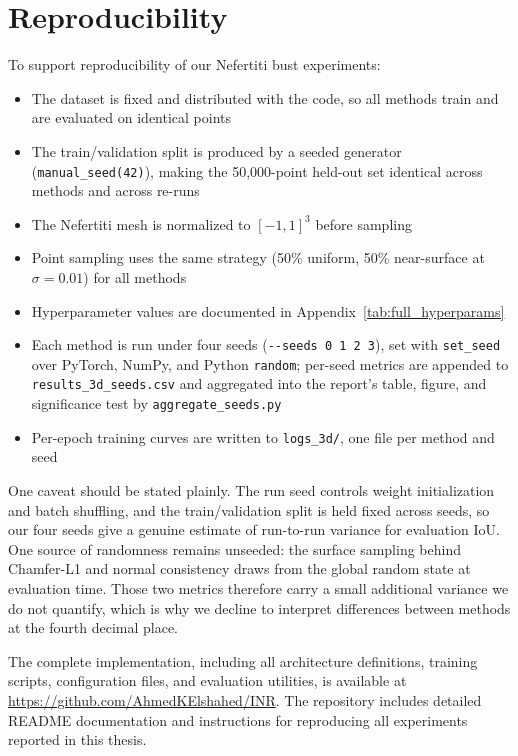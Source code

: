 \section{Reproducibility}

To support reproducibility of our Nefertiti bust experiments:
\begin{itemize}
    \item The dataset is fixed and distributed with the code, so all methods train and are evaluated on identical points
    \item The train/validation split is produced by a seeded generator (\texttt{manual\_seed(42)}), making the 50,000-point held-out set identical across methods and across re-runs
    \item The Nefertiti mesh is normalized to $[-1, 1]^3$ before sampling
    \item Point sampling uses the same strategy (50\% uniform, 50\% near-surface at $\sigma = 0.01$) for all methods
    \item Hyperparameter values are documented in Appendix~\ref{tab:full_hyperparams}
    \item Each method is run under four seeds (\texttt{-{}-seeds 0 1 2 3}), set with \texttt{set\_seed} over PyTorch, NumPy, and Python \texttt{random}; per-seed metrics are appended to \texttt{results\_3d\_seeds.csv} and aggregated into the report's table, figure, and significance test by \texttt{aggregate\_seeds.py}
    \item Per-epoch training curves are written to \texttt{logs\_3d/}, one file per method and seed
\end{itemize}

One caveat should be stated plainly. The run seed controls weight initialization and batch shuffling, and the train/validation split is held fixed across seeds, so our four seeds give a genuine estimate of run-to-run variance for evaluation IoU. One source of randomness remains unseeded: the surface sampling behind Chamfer-L1 and normal consistency draws from the global random state at evaluation time. Those two metrics therefore carry a small additional variance we do not quantify, which is why we decline to interpret differences between methods at the fourth decimal place.

The complete implementation, including all architecture definitions, training scripts, configuration files, and evaluation utilities, is available at \url{https://github.com/AhmedKElshahed/INR}. The repository includes detailed README documentation and instructions for reproducing all experiments reported in this thesis.